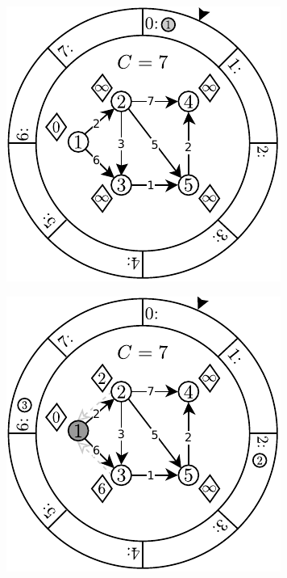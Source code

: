 \begin{figure}[!htbp]
	\centering
	\begin{subfigure}[b]{0.3\textwidth}
		\includegraphics[width=\textwidth]{Chapter_II/DIAL-Example/a.pdf}
		\caption{}
	\end{subfigure}
	\qquad
	\begin{subfigure}[b]{0.3\textwidth}
		\includegraphics[width=\textwidth]{Chapter_II/DIAL-Example/b.pdf}

\end{subfigure}
\end{figure}

